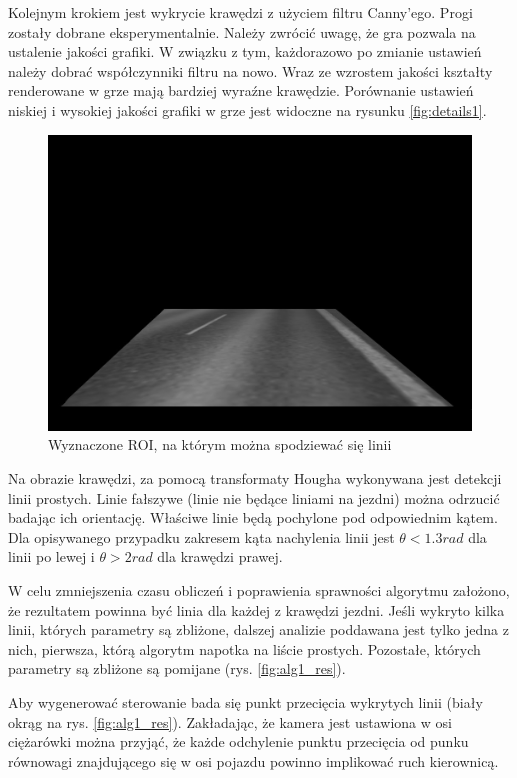 Kolejnym krokiem jest wykrycie krawędzi z użyciem filtru Canny'ego. 
Progi zostały dobrane eksperymentalnie. 
Należy zwrócić uwagę, że gra pozwala na ustalenie jakości grafiki. 
W związku z tym, każdorazowo po zmianie ustawień należy dobrać współczynniki filtru na nowo. 
Wraz ze wzrostem jakości kształty renderowane w grze mają bardziej wyraźne krawędzie. 
Porównanie ustawień niskiej i wysokiej jakości grafiki w grze jest widoczne na rysunku \ref{fig:details1}. 

\begin{figure}
  \centering
  \includegraphics[width=13cm]{img/alg1_roi.jpg}
  \caption{Wyznaczone ROI, na którym można spodziewać się linii}
  \label{fig:alg1_roi}
\end{figure}

Na obrazie krawędzi, za pomocą transformaty Hougha wykonywana jest detekcji linii prostych. 
Linie fałszywe (linie nie będące liniami na jezdni) można odrzucić badając ich orientację. 
Właściwe linie będą pochylone pod odpowiednim kątem. 
Dla opisywanego przypadku zakresem kąta nachylenia linii jest $\theta < 1.3rad$ dla linii po lewej i $\theta > 2rad$ dla krawędzi prawej. 

W celu zmniejszenia czasu obliczeń i poprawienia sprawności algorytmu założono, że rezultatem powinna być linia dla każdej z krawędzi jezdni. 
Jeśli wykryto kilka linii, których parametry są zbliżone, dalszej analizie poddawana jest tylko jedna z nich, pierwsza, którą algorytm napotka na liście prostych. 
Pozostałe, których parametry są zbliżone są pomijane (rys. \ref{fig:alg1_res}).


Aby wygenerować sterowanie bada się punkt przecięcia wykrytych linii (biały okrąg na rys. \ref{fig:alg1_res}). 
Zakładając, że kamera jest ustawiona w osi ciężarówki można przyjąć, że każde odchylenie punktu przecięcia od punku równowagi znajdującego się w osi pojazdu powinno implikować ruch kierownicą.

